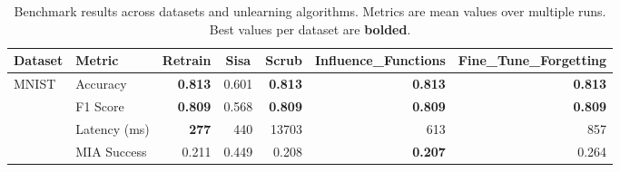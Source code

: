 \begin{table}[t]
\centering
\caption{Benchmark results across datasets and unlearning algorithms. Metrics are mean values over multiple runs. Best values per dataset are \textbf{bolded}.}
\label{tab:main_results}
\small
\setlength{\tabcolsep}{4pt}
\begin{tabular}{llrrrrr}
\toprule
Dataset & Metric & \multicolumn{1}{c}{Retrain} & \multicolumn{1}{c}{Sisa} & \multicolumn{1}{c}{Scrub} & \multicolumn{1}{c}{Influence\_Functions} & \multicolumn{1}{c}{Fine\_Tune\_Forgetting} \\
\midrule
MNIST & Accuracy & \textbf{0.813} & 0.601 & \textbf{0.813} & \textbf{0.813} & \textbf{0.813} \\
 & F1 Score & \textbf{0.809} & 0.568 & \textbf{0.809} & \textbf{0.809} & \textbf{0.809} \\
 & Latency (ms) & \textbf{277} & 440 & 13703 & 613 & 857 \\
 & MIA Success & 0.211 & 0.449 & 0.208 & \textbf{0.207} & 0.264 \\
\midrule
\bottomrule
\end{tabular}
\end{table}